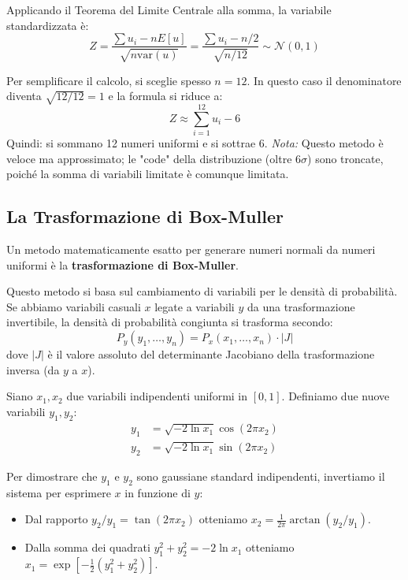 \documentclass[openany,a4paper,12pt]{book}
\theoremstyle{remark}
\begin{document}
Applicando il Teorema del Limite Centrale alla somma, la variabile standardizzata è:
\begin{equation}
Z = \frac{\sum u_i - n E[u]}{\sqrt{n \text{var}(u)}} = \frac{\sum u_i - n/2}{\sqrt{n/12}} \sim \mathcal{N}(0,1)
\end{equation}

Per semplificare il calcolo, si sceglie spesso $n=12$. In questo caso il denominatore diventa $\sqrt{12/12} = 1$ e la formula si riduce a:
\begin{equation}
Z \approx \sum_{i=1}^{12} u_i - 6
\end{equation}
Quindi: si sommano 12 numeri uniformi e si sottrae 6.
\textit{Nota:} Questo metodo è veloce ma approssimato; le "code" della distribuzione (oltre $6\sigma$) sono troncate, poiché la somma di variabili limitate è comunque limitata.


\subsection{La Trasformazione di Box-Muller}
Un metodo matematicamente esatto per generare numeri normali da numeri uniformi è la \textbf{trasformazione di Box-Muller}.

Questo metodo si basa sul cambiamento di variabili per le densità di probabilità. Se abbiamo variabili casuali $x$ legate a variabili $y$ da una trasformazione invertibile, la densità di probabilità congiunta si trasforma secondo:
\begin{equation}
P_y(y_1, \dots, y_n) = P_x(x_1, \dots, x_n) \cdot |J|
\end{equation}
dove $|J|$ è il valore assoluto del determinante Jacobiano della trasformazione inversa (da $y$ a $x$).

Siano $x_1, x_2$ due variabili indipendenti uniformi in $[0, 1]$. Definiamo due nuove variabili $y_1, y_2$:
\begin{align}
y_1 &= \sqrt{-2 \ln x_1} \cos(2\pi x_2) \\
y_2 &= \sqrt{-2 \ln x_1} \sin(2\pi x_2)
\end{align}

Per dimostrare che $y_1$ e $y_2$ sono gaussiane standard indipendenti, invertiamo il sistema per esprimere $x$ in funzione di $y$:
\begin{itemize}
    \item Dal rapporto $y_2/y_1 = \tan(2\pi x_2)$ otteniamo $x_2 = \frac{1}{2\pi} \arctan(y_2/y_1)$.
    \item Dalla somma dei quadrati $y_1^2 + y_2^2 = -2 \ln x_1$ otteniamo $x_1 = \exp\left[-\frac{1}{2}(y_1^2 + y_2^2)\right]$.
\end{itemize}
\end{document}
